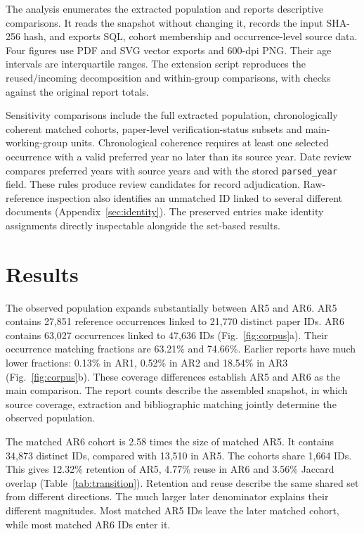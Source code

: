 \documentclass[11pt,a4paper]{article}
\begin{document}
The analysis enumerates the extracted population and reports descriptive comparisons. It reads the snapshot without changing it, records the input SHA-256 hash, and exports SQL, cohort membership and occurrence-level source data. Four figures use PDF and SVG vector exports and 600-dpi PNG. Their age intervals are interquartile ranges. The extension script reproduces the reused/incoming decomposition and within-group comparisons, with checks against the original report totals.

Sensitivity comparisons include the full extracted population, chronologically coherent matched cohorts, paper-level verification-status subsets and main-working-group units. Chronological coherence requires at least one selected occurrence with a valid preferred year no later than its source year. Date review compares preferred years with source years and with the stored \texttt{parsed\_year} field. These rules produce review candidates for record adjudication. Raw-reference inspection also identifies an unmatched ID linked to several different documents (Appendix~\ref{sec:identity}). The preserved entries make identity assignments directly inspectable alongside the set-based results.

\section{Results}
The observed population expands substantially between AR5 and AR6. AR5 contains 27,851 reference occurrences linked to 21,770 distinct paper IDs. AR6 contains 63,027 occurrences linked to 47,636 IDs (Fig.~\ref{fig:corpus}a). Their occurrence matching fractions are 63.21\% and 74.66\%. Earlier reports have much lower fractions: 0.13\% in AR1, 0.52\% in AR2 and 18.54\% in AR3 (Fig.~\ref{fig:corpus}b). These coverage differences establish AR5 and AR6 as the main comparison. The report counts describe the assembled snapshot, in which source coverage, extraction and bibliographic matching jointly determine the observed population.

The matched AR6 cohort is 2.58 times the size of matched AR5. It contains 34,873 distinct IDs, compared with 13,510 in AR5. The cohorts share 1,664 IDs. This gives 12.32\% retention of AR5, 4.77\% reuse in AR6 and 3.56\% Jaccard overlap (Table~\ref{tab:transition}). Retention and reuse describe the same shared set from different directions. The much larger later denominator explains their different magnitudes. Most matched AR5 IDs leave the later matched cohort, while most matched AR6 IDs enter it.
\end{document}
